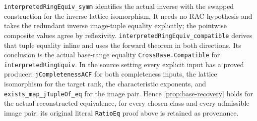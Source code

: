 \documentclass[11pt,oneside]{article}
\theoremstyle{definition}
\theoremstyle{remark}
\newcommand{\lean}[1]{\nolinkurl{#1}}
\begin{document}
\lean{interpretedRingEquiv_symm} identifies the actual inverse with the swapped
construction for the inverse lattice isomorphism. It needs no RAC hypothesis
and takes the redundant inverse image-tuple equality explicitly; the pointwise
composite values agree by reflexivity.
\lean{interpretedRingEquiv_compatible} derives that tuple equality inline and
uses the forward theorem in both directions. Its conclusion is the actual
base-range equality \lean{CrossBase.Compatible} for \lean{interpretedRingEquiv}.
In the source setting every explicit input has a proved producer: \lean{jCompletenessACF}
for both completeness inputs, the lattice isomorphism for the target rank, the
characteristic exponents, and \lean{exists_map_jTupleOf_eq} for the image pair. Hence
\cref{prop:base-recovery} holds for the actual reconstructed equivalence, for every chosen
class and every admissible image pair; its original literal \lean{RatioEq} proof above is
retained as provenance.
\end{document}
